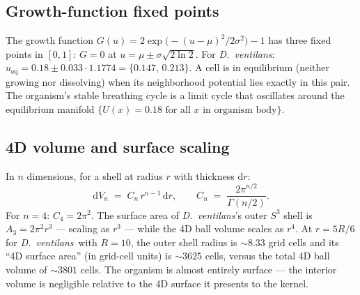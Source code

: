 \documentclass[11pt,a4paper]{article}
\newcommand{\spc}[1]{\textit{#1}}  %
\newcommand{\DV}{\spc{D.\ ventilans}}
\begin{document}
\subsection{Growth-function fixed points}
The growth function $G(u)=2\exp\!\bigl(-(u-\mu)^{2}/2\sigma^{2}\bigr)-1$
has three fixed points in $[0,1]$: $G=0$ at $u=\mu\pm
\sigma\sqrt{2\ln 2}$. For \DV: $u_{\text{eq}} = 0.18 \pm 0.033\cdot
1.1774 = \{0.147,\,0.213\}$. A cell is in equilibrium (neither growing
nor dissolving) when its neighborhood potential lies exactly in this
pair. The organism's stable breathing cycle is a limit cycle that
oscillates around the equilibrium manifold $\{U(x) = 0.18 \text{ for
all } x \text{ in organism body}\}$.

\subsection{4D volume and surface scaling}
In $n$ dimensions, for a shell at radius $r$ with thickness $\mathrm{d}r$:
\begin{equation}
\mathrm{d}V_{n} \;=\; C_{n}\, r^{n-1}\,\mathrm{d}r,
\qquad
C_{n} \;=\; \frac{2\pi^{n/2}}{\Gamma(n/2)}.
\end{equation}
For $n=4$: $C_{4}=2\pi^{2}$. The surface area of \DV's outer $S^{3}$
shell is $A_{3}=2\pi^{2}r^{3}$ --- scaling as $r^{3}$ --- while the 4D
ball volume scales as $r^{4}$. At $r=5R/6$ for \DV\ with $R=10$, the
outer shell radius is $\sim 8.33$ grid cells and its ``4D surface area''
(in grid-cell units) is $\sim 3625$ cells, versus the total 4D ball
volume of $\sim 3801$ cells. The organism is almost entirely surface ---
the interior volume is negligible relative to the 4D surface it presents
to the kernel.
\end{document}
